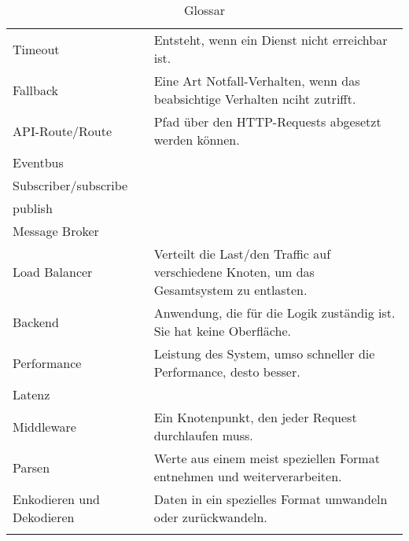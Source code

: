 \begin{longtable}{lp{10cm}}
	Timeout & Entsteht, wenn ein Dienst nicht erreichbar ist.\\
	Fallback & Eine Art Notfall-Verhalten, wenn das beabsichtige Verhalten nciht zutrifft.\\
	API-Route/Route & Pfad über den HTTP-Requests abgesetzt werden können.\\
	Eventbus & \\
	Subscriber/subscribe & \\
	publish & \\
	Message Broker & \\
	Load Balancer & Verteilt die Last/den Traffic auf verschiedene Knoten, um das Gesamtsystem zu entlasten.\\
	Backend & Anwendung, die für die Logik zuständig ist. Sie hat keine Oberfläche.\\
	Performance & Leistung des System, umso schneller die Performance, desto besser.\\
	Latenz & \\
	Middleware & Ein Knotenpunkt, den jeder Request durchlaufen muss. \\
	Parsen & Werte aus einem meist speziellen Format entnehmen und weiterverarbeiten. \\ 
	Enkodieren und Dekodieren & Daten in ein spezielles Format umwandeln oder zurückwandeln.\\
	\caption[Glossar]{Glossar}
\end{longtable}